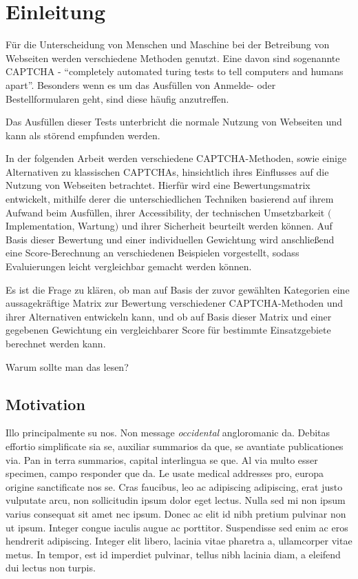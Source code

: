 \chapter{Einleitung}
\label{ch:intro}

Für die Unterscheidung von Menschen und Maschine bei der Betreibung von Webseiten werden verschiedene Methoden genutzt.
Eine davon sind sogenannte CAPTCHA - ``completely automated turing tests to tell computers and humans apart''.
Besonders wenn es um das Ausfüllen von Anmelde- oder Bestellformularen geht, sind diese häufig anzutreffen.

Das Ausfüllen dieser Tests unterbricht die normale Nutzung von Webseiten und kann als störend empfunden werden.

In der folgenden Arbeit werden verschiedene CAPTCHA-Methoden, sowie einige Alternativen zu klassischen CAPTCHAs,
hinsichtlich ihres Einflusses auf die Nutzung von Webseiten betrachtet.
Hierfür wird eine Bewertungsmatrix entwickelt, mithilfe derer die unterschiedlichen Techniken basierend auf
ihrem Aufwand beim Ausfüllen, ihrer Accessibility, der technischen Umsetzbarkeit $($Implementation, Wartung$)$ und ihrer Sicherheit beurteilt werden können.
Auf Basis dieser Bewertung und einer individuellen Gewichtung wird anschließend eine Score-Berechnung an verschiedenen Beispielen vorgestellt,
sodass Evaluierungen leicht vergleichbar gemacht werden können.

Es ist die Frage zu klären, ob man auf Basis der zuvor gewählten Kategorien eine aussagekräftige Matrix zur
Bewertung verschiedener CAPTCHA-Methoden und ihrer Alternativen entwickeln kann, und ob auf Basis dieser Matrix und einer gegebenen Gewichtung
ein vergleichbarer Score für bestimmte Einsatzgebiete berechnet werden kann.

Warum sollte man das lesen?


\section{Motivation}
\label{sec:intro:motivation}
Illo principalmente su nos. Non message \emph{occidental} angloromanic da. Debitas effortio simplificate sia se, auxiliar summarios da que, se avantiate publicationes via. Pan in terra summarios, capital interlingua se que. Al via multo esser specimen, campo responder que da. Le usate medical addresses pro, europa origine sanctificate nos se. Cras faucibus, leo ac adipiscing adipiscing, erat justo vulputate arcu, non sollicitudin ipsum dolor eget lectus. Nulla sed mi non ipsum varius consequat sit amet nec ipsum. Donec ac elit id nibh pretium pulvinar non ut ipsum. Integer congue iaculis augue ac porttitor. Suspendisse sed enim ac eros hendrerit adipiscing. Integer elit libero, lacinia vitae pharetra a, ullamcorper vitae metus. In tempor, est id imperdiet pulvinar, tellus nibh lacinia diam, a eleifend dui lectus non turpis.

